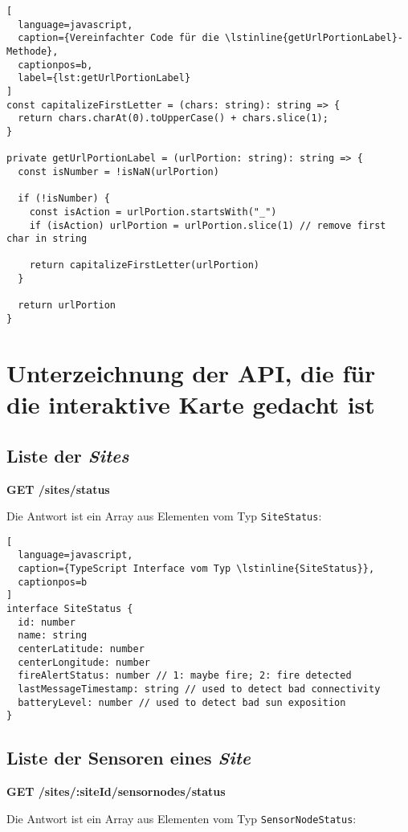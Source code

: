 \begin{lstlisting}[
  language=javascript,
  caption={Vereinfachter Code für die \lstinline{getUrlPortionLabel}-Methode},
  captionpos=b,
  label={lst:getUrlPortionLabel}
]
const capitalizeFirstLetter = (chars: string): string => {
  return chars.charAt(0).toUpperCase() + chars.slice(1);
}

private getUrlPortionLabel = (urlPortion: string): string => {
  const isNumber = !isNaN(urlPortion)

  if (!isNumber) {
    const isAction = urlPortion.startsWith("_")
    if (isAction) urlPortion = urlPortion.slice(1) // remove first char in string

    return capitalizeFirstLetter(urlPortion)
  }

  return urlPortion
}
\end{lstlisting}

\section{Unterzeichnung der API, die für die interaktive Karte gedacht ist} \label{appendix:map-api}
\subsection{Liste der \textit{Sites}}

\textbf{GET /sites/status}

Die Antwort ist ein Array aus Elementen vom Typ \lstinline{SiteStatus}:

\begin{lstlisting}[
  language=javascript,
  caption={TypeScript Interface vom Typ \lstinline{SiteStatus}},
  captionpos=b
]
interface SiteStatus {
  id: number
  name: string
  centerLatitude: number
  centerLongitude: number
  fireAlertStatus: number // 1: maybe fire; 2: fire detected
  lastMessageTimestamp: string // used to detect bad connectivity
  batteryLevel: number // used to detect bad sun exposition
}
\end{lstlisting}

\subsection{Liste der Sensoren eines \textit{Site}}

\textbf{GET /sites/:siteId/sensornodes/status}

Die Antwort ist ein Array aus Elementen vom Typ \lstinline{SensorNodeStatus}:

